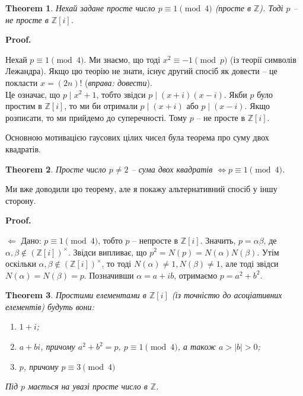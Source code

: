 \documentclass[a4paper, 10pt]{article}
\makeatletter
\def\leftproof{$\boxed{\Leftarrow}$ }
\theoremstyle{theoremdd}
\newtheorem{theorem}{Theorem}[subsection]
\theoremstyle{theoremdd}
\theoremstyle{theoremdd}
\theoremstyle{theoremdd}
\theoremstyle{theoremdd}
\theoremstyle{theoremdd}
\theoremstyle{theoremdd}
\theoremstyle{theoremdd}
\theoremstyle{theoremdd}
\theoremstyle{theoremdd}
\theoremstyle{theoremdd}
\theoremstyle{theoremdd}
\theoremstyle{theoremdd}
\theoremstyle{theoremdd}
\theoremstyle{theoremdd}
\renewenvironment{proof}[1][Proof.\\]{\par
\pushQED{\hfill \qed}%
\normalfont \topsep6\p@\@plus6\p@\relax
\trivlist
\item\relax
{\bfseries
#1\@addpunct{.}}\hspace\labelsep\ignorespaces
}{%
\popQED\endtrivlist\@endpefalse
}
\makeatother
\begin{document}
\begin{theorem}
Нехай задане просте число $p \equiv 1 \pmod 4$ (просте в $\mathbb{Z}$). Тоді $p$ -- не просте в $\mathbb{Z}[i]$.
\end{theorem}

\begin{proof}
Нехай $p \equiv 1 \pmod 4$. Ми знаємо, що тоді $x^2 \equiv -1 \pmod p$ (із теорії символів Лежандра). Якщо цю теорію не знати, існує другий спосіб як довести -- це покласти $x = (2n)!$ (\textit{вправа: довести}).\\
Це означає, що $p \mid x^2 + 1$, тобто звідси $p \mid (x+i)(x-i)$. Якби $p$ було простим в $\mathbb{Z}[i]$, то ми би отримали $p \mid (x+i)$ або $p \mid (x-i)$. Якщо розписати, то ми прийдемо до суперечності. Тому $p$ -- не просте в $\mathbb{Z}[i]$.
\end{proof}

Основною мотивацією гаусових цілих чисел була теорема про суму двох квадратів.

\begin{theorem}
Просте число $p \neq 2$ -- сума двох квадратів $\iff p \equiv 1 \pmod 4$. 
\end{theorem}

Ми вже доводили цю теорему, але я покажу альтернативний спосіб у іншу сторону.

\begin{proof}
\leftproof Дано: $p \equiv 1 \pmod 4$, тобто $p$ -- непросте в $\mathbb{Z}[i]$. Значить, $p = \alpha \beta$, де $\alpha,\beta \notin (\mathbb{Z}[i])^\times$. Звідси випливає, що $p^2 = N(p) = N(\alpha) N(\beta)$. Утім оскільки $\alpha,\beta \notin (\mathbb{Z}[i])^\times$, то тоді $N(\alpha) \neq 1, N(\beta) \neq 1$, але тоді звідси $N(\alpha) = N(\beta) = p$. Позначивши $\alpha = a + ib$, отримаємо $p = a^2 + b^2$.
\end{proof}

\begin{theorem}
Простими елементами в $\mathbb{Z}[i]$ (із точністю до асоціативних елементів) будуть вони:
\begin{enumerate}[nosep,wide=0pt,label={\arabic*)}]
\item $1 + i$;
\item $a + bi$, причому $a^2 + b^2 = p,\ p \equiv 1 \pmod 4$, а також $a > |b| > 0$;
\item $p$, причому $p \equiv 3 \pmod 4$
\end{enumerate}
Під $p$ мається на увазі просте число в $\mathbb{Z}$.
\end{theorem}
\end{document}
